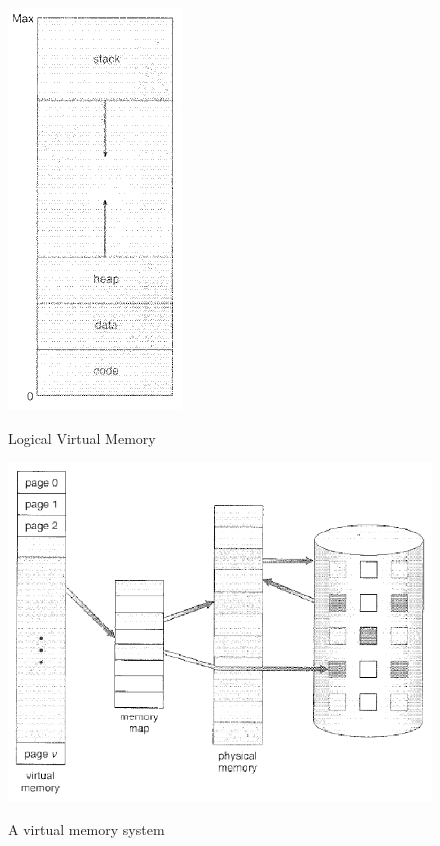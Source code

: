 \documentclass[10pt,a4paper]{article}
\begin{document}
\begin{figure}
\caption{Logical Virtual Memory \cite{OSCONCEPTS}}
\begin{center}
\includegraphics[scale=0.6]{../images/virtmem-log.png}
\label{virtmemlog}
\end{center}
\end{figure}
\begin{figure}
\caption{A virtual memory system \cite{OSCONCEPTS}}
\begin{center}
\includegraphics[scale=0.45]{../images/virtmem.png}
\label{virtmem}
\end{center}
\end{figure}
\end{document}
